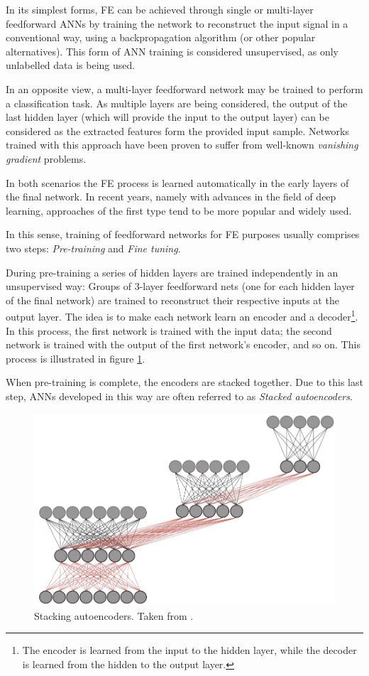\documentclass[9pt,journal,compsoc]{IEEEtran}
\begin{document}
In its simplest forms, FE can be achieved through single or multi-layer feedforward ANNs by training the network to reconstruct the input signal in a conventional way, using a backpropagation algorithm (or other popular alternatives). This form of ANN training is considered unsupervised, as only unlabelled data is being used.

In an opposite view, a multi-layer feedforward network may be trained to perform a classification task. As multiple layers are being considered, the output of the last hidden layer (which will provide the input to the output layer) can be considered as the extracted features form the provided input sample. Networks trained with this approach have been proven to suffer from well-known \emph{vanishing gradient} problems\cite{nielsen2015neural}.

In both scenarios the FE process is learned automatically in the early layers of the final network. In recent years, namely with advances in the field of deep learning, approaches of the first type tend to be more popular and widely used.

In this sense, training of feedforward networks for FE purposes usually comprises two steps: \emph{Pre-training} and \emph{Fine tuning}.

During pre-training a series of hidden layers are trained independently in an unsupervised way: Groups of 3-layer feedforward nets (one for each hidden layer of the final network) are trained to reconstruct their respective inputs at the output layer. The idea is to make each network learn an encoder and a decoder\footnote{The encoder is learned from the input to the hidden layer, while the decoder is learned from the hidden to the output layer.}. In this process, the first network is trained with the input data; the second network is trained with the output of the first network's encoder, and so on. This process is illustrated in figure \ref{barata_saes}.

When pre-training is complete, the encoders are stacked together. Due to this last step, ANNs developed in this way are often referred to as \emph{Stacked autoencoders}.

\begin{figure}[ht]
	\centering
	\includegraphics[scale=0.25]{stacked_autoencoders.png}
	\caption{Stacking autoencoders. Taken from \cite{barata_saes_presentation}.}
	\label{barata_saes}
\end{figure}
\end{document}
